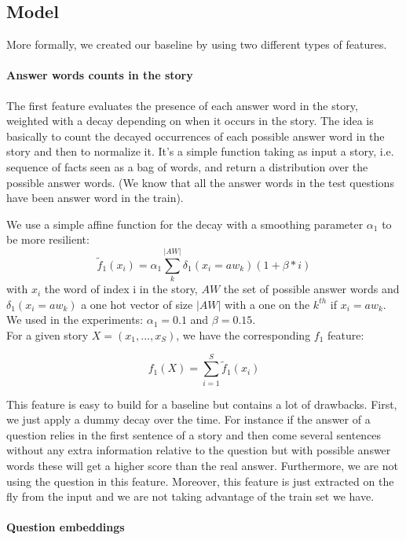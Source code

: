 \documentclass[twoside,11pt]{article}
\begin{document}
\subsection{Model}
More formally, we created our baseline by using two different types of features.

\paragraph{Answer words counts in the story}

The first feature evaluates the presence of each answer word in the story, weighted with a decay depending on when it occurs in the story. The idea is basically to count the decayed occurrences of each possible answer word in the story and then to normalize it. It's a simple function taking as input a story, i.e. sequence of facts seen as a bag of words, and return a distribution over the possible answer words. (We know that all the answer words in the test questions have been answer word in the train).

\noindent We use a simple affine function for the decay with a smoothing parameter $\alpha_1$ to be more resilient: $$\tilde{f}_1(x_i) = \alpha_1 \sum_k^{|AW|}\delta_1(x_i = aw_k)(1 + \beta * i)$$
with $x_i$ the word of index i in the story, $AW$ the set of possible answer words and $\delta_1(x_i = aw_k)$ a one hot vector of size $|AW|$ with a one on the $k^{th}$ if $x_i = aw_k$. We used in the experiments: $\alpha_1 = 0.1$ and $\beta = 0.15$. \\

\noindent For a given story $X=(x_1, ..., x_S)$, we have the corresponding $f_1$ feature:

\[
f_1(X) = \sum_{i=1}^S\tilde{f}_1(x_i)
\]

\noindent This feature is easy to build for a baseline but contains a lot of drawbacks. First, we just apply a dummy decay over the time. For instance if the answer of a question relies in the first sentence of a story and then come several sentences without any extra information relative to the question but with possible answer words these will get a higher score than the real answer. Furthermore, we are not using the question in this feature. Moreover, this feature is just extracted on the fly from the input and we are not taking advantage of the train set we have. 

\paragraph{Question embeddings}
\end{document}
